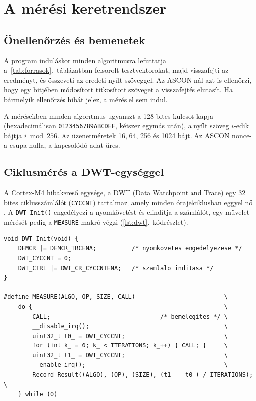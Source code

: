 \documentclass[a4paper,12pt]{report}
\theoremstyle{definition}
\theoremstyle{remark}
\begin{document}
\section{A mérési keretrendszer}\label{sec:keretrendszer}

\subsection{Önellenőrzés és bemenetek}

A program induláskor minden algoritmusra lefuttatja a~\ref{tab:forrasok}.~táblázatban felsorolt tesztvektorokat, majd visszafejti az eredményt, és összeveti az eredeti nyílt szöveggel. Az ASCON-nál azt is ellenőrzi, hogy egy bitjében módosított titkosított szöveget a visszafejtés elutasít. Ha bármelyik ellenőrzés hibát jelez, a mérés el sem indul.

A mérésekben minden algoritmus ugyanazt a 128 bites kulcsot kapja (hexadecimálisan \texttt{0123456789ABCDEF}, kétszer egymás után), a nyílt szöveg $i$-edik bájtja $i \bmod 256$. Az üzenetméretek 16, 64, 256 és 1024 bájt. Az ASCON nonce-a csupa nulla, a kapcsolódó adat üres.

\subsection{Ciklusmérés a DWT-egységgel}

A Cortex-M4 hibakereső egysége, a DWT (Data Watchpoint and Trace) egy 32 bites ciklusszámlálót (\texttt{CYCCNT}) tartalmaz, amely minden órajelciklusban eggyel nő \cite{ARMCM4}. A \mbox{\texttt{DWT\_Init()}} engedélyezi a nyomkövetést és elindítja a számlálót, egy művelet mérését pedig a \texttt{MEASURE} makró végzi (\ref{lst:dwt}.~kódrészlet).

\noindent\begin{minipage}{\textwidth}
\begin{verbatim}
void DWT_Init(void) {
    DEMCR |= DEMCR_TRCENA;          /* nyomkovetes engedelyezese */
    DWT_CYCCNT = 0;
    DWT_CTRL |= DWT_CR_CYCCNTENA;   /* szamlalo inditasa */
}

#define MEASURE(ALGO, OP, SIZE, CALL)                         \
    do {                                                      \
        CALL;                               /* bemelegites */ \
        __disable_irq();                                      \
        uint32_t t0_ = DWT_CYCCNT;                            \
        for (int k_ = 0; k_ < ITERATIONS; k_++) { CALL; }     \
        uint32_t t1_ = DWT_CYCCNT;                            \
        __enable_irq();                                       \
        Record_Result((ALGO), (OP), (SIZE), (t1_ - t0_) / ITERATIONS); \
    } while (0)
\end{verbatim}
\label{lst:dwt}
\end{minipage}
\end{document}
